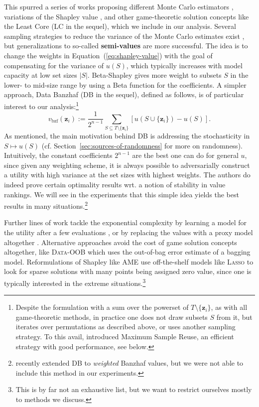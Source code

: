 \documentclass[10pt]{article}
\newcommand{\assign}{:=}
\newcommand{\tmdfn}[1]{\textbf{#1}}
\newcommand{\tmem}[1]{{\em #1\/}}
\newcommand{\tmmathbf}[1]{\ensuremath{\boldsymbol{#1}}}
\newcommand{\tmname}[1]{\textsc{#1}}
\newcommand{\tmop}[1]{\ensuremath{\operatorname{#1}}}
\begin{document}
This spurred a series of works proposing different Monte Carlo estimators
{\citep{okhrati_multilinear_2021}}, variations of the Shapley value
{\citep{kwon_efficient_2021}}, and other game-theoretic solution concepts
like the Least Core {\citep{yan_if_2021,benmerzoug_re_2023}} (LC in the
sequel), which we include in our analysis. Several sampling strategies to
reduce the variance of the Monte Carlo estimates exist
{\citep{wu_variance_2023,covert_stochastic_2024}}, but generalizations to
so-called {\tmdfn{semi-values}} are more successful. The idea is to change the
weights in  Equation~(\ref{eq:shapley-value}) with the goal of compensating
for the variance of $u (S)$, which typically increases with model capacity at
low set sizes $|S|$. Beta-Shapley {\citep{kwon_beta_2022}} gives more weight
to subsets $S$ in the lower- to mid-size range by using a Beta function for
the coefficients. A simpler approach, Data Banzhaf {\citep{wang_data_2023}}
(DB in the sequel), defined as follows, is of particular interest to our
analysis:\footnote{Despite the formulation with a sum over the powerset of $T
\setminus \{\tmmathbf{z}_i \}$, as with all game-theoretic methods, in
practice one does not draw subsets $S$ from it, but iterates over permutations
as described above, or uses another sampling strategy. To this avail,
{\cite{wang_data_2023}} introduced Maximum Sample Reuse, an efficient
strategy with good performance, see below.}
\begin{equation}
  v_{\tmop{bzf}} (\tmmathbf{z}_i) \assign \frac{1}{2^{n - 1}}  \sum_{S
  \subseteq T \setminus \{\tmmathbf{z}_i \}} [u (S \cup \{\tmmathbf{z}_i \}) -
  u (S)] . \label{eq:banzhaf-value}
\end{equation}
As mentioned, the main motivation behind DB is addressing the stochasticity in
$S \mapsto u (S)$ (cf.  Section~\ref{sec:sources-of-randomness} for more on
randomness). Intuitively, the constant coefficients $2^{n - 1}$ are the best
one can do for general $u$, since given any weighting scheme, it is always
possible to adversarially construct a utility with high variance at the set
sizes with highest weights. The authors do indeed prove certain optimality
results wrt. a notion of stability in value rankings. We will see in the
experiments that this simple idea yields the best results in many
situations.\footnote{{\citep{li_robust_2023}} recently extended DB to
{\tmem{weighted}} Banzhaf values, but we were not able to include this method
in our experiments.}

Further lines of work tackle the exponential complexity by learning a model
for the utility after a few evaluations {\citep{wang_improving_2022}}, or by
replacing the values with a proxy model altogether
{\cite{jia_scalability_2021}}. Alternative approaches avoid the cost of game
solution concepts altogether, like {\tmname{Data-OOB}}
{\cite{kwon_dataoob_2023}} which uses the out-of-bag error estimate of a
bagging model. Reformulations of Shapley like AME {\cite{lin_measuring_2022}}
use off-the-shelf models like {\tmname{Lasso}} to look for sparse solutions
with many points being assigned zero value, since one is typically interested
in the extreme situations.\footnote{This is by far not an exhaustive list, but
we want to restrict ourselves mostly to methods we discuss.}
\end{document}
